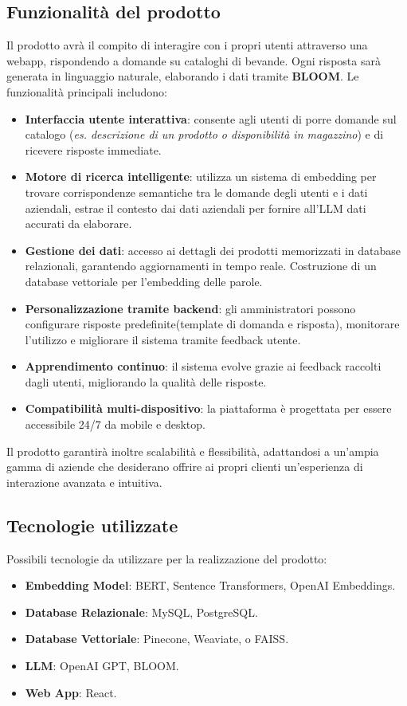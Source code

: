 \subsection{Funzionalità del prodotto}
Il prodotto avrà il compito di interagire con i propri utenti attraverso una webapp, rispondendo a domande su cataloghi di bevande. Ogni risposta sarà generata in linguaggio naturale, elaborando i dati tramite \textbf{BLOOM}. Le funzionalità principali includono:
\begin{itemize}
    \item \textbf{Interfaccia utente interattiva}: consente agli utenti di porre domande sul catalogo (\textit{es. descrizione di un prodotto o disponibilità in magazzino}) e di ricevere risposte immediate.
    \item \textbf{Motore di ricerca intelligente}: utilizza un sistema di embedding per trovare corrispondenze semantiche tra le domande degli utenti e i dati aziendali, estrae il contesto dai dati aziendali per fornire all'LLM dati accurati da elaborare.
    \item \textbf{Gestione dei dati}: accesso ai dettagli dei prodotti memorizzati in database relazionali, garantendo aggiornamenti in tempo reale. Costruzione di un database vettoriale per l'embedding delle parole.
    \item \textbf{Personalizzazione tramite backend}: gli amministratori possono configurare risposte predefinite(template di domanda e risposta), monitorare l’utilizzo e migliorare il sistema tramite feedback utente.
    \item \textbf{Apprendimento continuo}: il sistema evolve grazie ai feedback raccolti dagli utenti, migliorando la qualità delle risposte.
    \item \textbf{Compatibilità multi-dispositivo}: la piattaforma è progettata per essere accessibile 24/7 da mobile e desktop.
\end{itemize}

Il prodotto garantirà inoltre scalabilità e flessibilità, adattandosi a un’ampia gamma di aziende che desiderano offrire ai propri clienti un’esperienza di interazione avanzata e intuitiva.

\subsection{Tecnologie utilizzate} %
Possibili tecnologie da utilizzare per la realizzazione del prodotto:
\begin{itemize}
    \item \textbf{Embedding Model}: BERT, Sentence Transformers, OpenAI Embeddings.
    \item \textbf{Database Relazionale}: MySQL, PostgreSQL.
    \item \textbf{Database Vettoriale}: Pinecone, Weaviate, o FAISS.
    \item \textbf{LLM}: OpenAI GPT, BLOOM.
    \item \textbf{Web App}: React.
\end{itemize}

